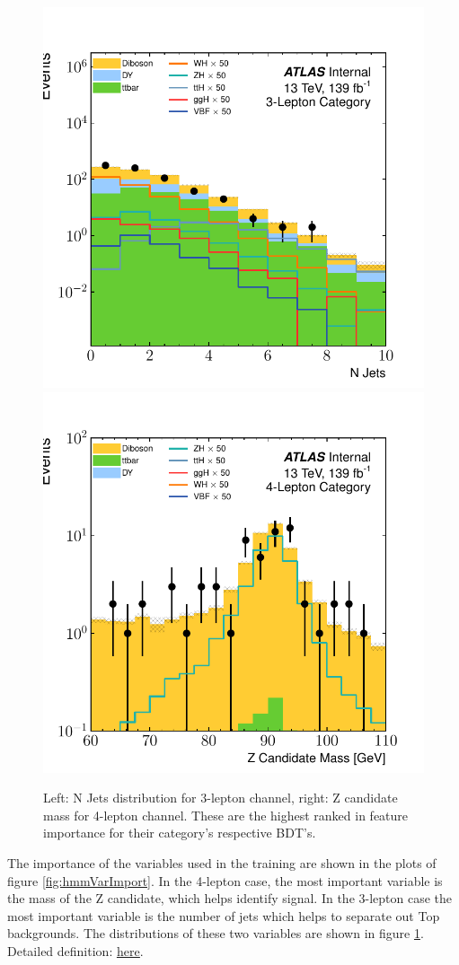 \begin{figure}[htpb]
  \centering
  \includegraphics[height=0.48\textwidth]{figures/hmm/nJets/histo-3lep-nJets.pdf}
  \includegraphics[height=0.48\textwidth]{figures/hmm/zCand/histo-4lep-auxDilep_mass.pdf}
  \caption{Left: N Jets distribution for 3-lepton channel, right: Z candidate mass for 4-lepton channel. These are the highest ranked in feature importance for their category's respective BDT's.}
    \label{fig:hmmImpVars}
\end{figure}

The importance of the variables used in the training are shown in the plots of figure \ref{fig:hmmVarImport}.
In the 4-lepton case, the most important variable is the mass of the Z candidate, which helps identify signal.
In the 3-lepton case the most important variable is the number of jets which helps to separate out Top backgrounds.
The distributions of these two variables are shown in figure \ref{fig:hmmImpVars}.
Detailed definition: \href{https://scikit-learn.org/stable/modules/feature_selection.html}{\underline{here}}.

